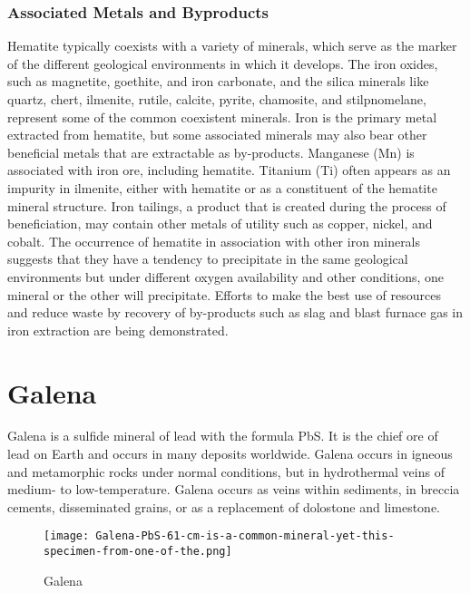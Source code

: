 \documentclass[12pt,a4paper, top=1.9cm, bottom=2.03cm, left=3.81cm, right=1.9cm]{article}
\begin{document}
\subsubsection{Associated Metals and Byproducts}
\vspace{0.5cm}
\noindent\fontsize{12}{14}\selectfont Hematite typically coexists with a variety of minerals, which serve as the marker of the different geological environments in which it develops. The iron oxides, such as magnetite, goethite, and iron carbonate, and the silica minerals like quartz, chert, ilmenite, rutile, calcite, pyrite, chamosite, and stilpnomelane, represent some of the common coexistent minerals. Iron is the primary metal extracted from hematite, but some associated minerals may also bear other beneficial metals that are extractable as by-products.
\clearpage
\noindent\fontsize{12}{14}\selectfont Manganese (Mn) is associated with iron ore, including hematite. Titanium (Ti) often appears as an impurity in ilmenite, either with hematite or as a constituent of the hematite mineral structure. Iron tailings, a product that is created during the process of beneficiation, may contain other metals of utility such as copper, nickel, and cobalt. The occurrence of hematite in association with other iron minerals suggests that they have a tendency to precipitate in the same geological environments but under different oxygen availability and other conditions, one mineral or the other will precipitate. Efforts to make the best use of resources and reduce waste by recovery of by-products such as slag and blast furnace gas in iron extraction are being demonstrated.
\newpage
\section{Galena}
\noindent\fontsize{12}{14}\selectfont Galena is a sulfide mineral of lead with the formula PbS. It is the chief ore of lead on Earth and occurs in many deposits worldwide. Galena occurs in igneous and metamorphic rocks under normal conditions, but in hydrothermal veins of medium- to low-temperature. Galena occurs as veins within sediments, in breccia cements, disseminated grains, or as a replacement of dolostone and limestone.
\begin{figure}[h!]
        \centering
\texttt{[image: Galena-PbS-61-cm-is-a-common-mineral-yet-this-specimen-from-one-of-the.png]}  %
        \caption{Galena}
    \end{figure}
\end{document}
